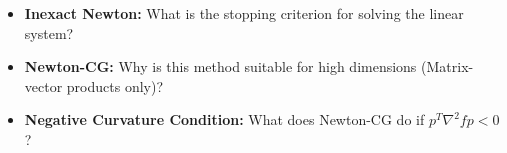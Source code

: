 \bigskip
\begin{checkpoint}
\begin{itemize}
    \item \textbf{Inexact Newton:} What is the stopping criterion for solving the linear system?
    \item \textbf{Newton-CG:} Why is this method suitable for high dimensions (Matrix-vector products only)?
    \item \textbf{Negative Curvature Condition:} What does Newton-CG do if $p^T \nabla^2 f p < 0$?
\end{itemize}
\end{checkpoint}
